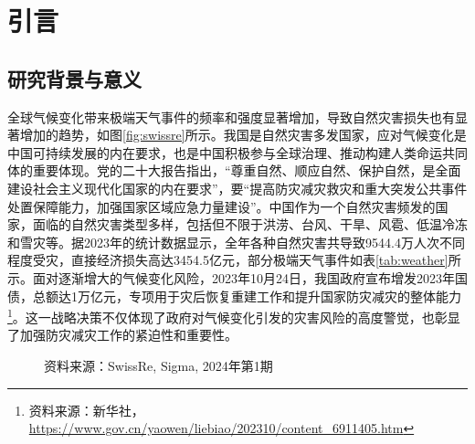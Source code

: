 \chapter{引言}
\section{研究背景与意义}

全球气候变化带来极端天气事件的频率和强度显著增加，导致自然灾害损失也有显著增加的趋势，如图\ref{fig:swissre}所示。我国是自然灾害多发国家，应对气候变化是中国可持续发展的内在要求，也是中国积极参与全球治理、推动构建人类命运共同体的重要体现。党的二十大报告指出，“尊重自然、顺应自然、保护自然，是全面建设社会主义现代化国家的内在要求”，要“提高防灾减灾救灾和重大突发公共事件处置保障能力，加强国家区域应急力量建设”。中国作为一个自然灾害频发的国家，面临的自然灾害类型多样，包括但不限于洪涝、台风、干旱、风雹、低温冷冻和雪灾等。据2023年的统计数据显示，全年各种自然灾害共导致9544.4万人次不同程度受灾，直接经济损失高达3454.5亿元，部分极端天气事件如表\ref{tab:weather}所示。面对逐渐增大的气候变化风险，2023年10月24日，我国政府宣布增发2023年国债，总额达1万亿元，专项用于灾后恢复重建工作和提升国家防灾减灾的整体能力\footnote{资料来源：新华社，\url{https://www.gov.cn/yaowen/liebiao/202310/content_6911405.htm}}。这一战略决策不仅体现了政府对气候变化引发的灾害风险的高度警觉，也彰显了加强防灾减灾工作的紧迫性和重要性。

\begin{figure}[htbp]
    \par\qquad {} 资料来源：SwissRe, Sigma, 2024年第1期
\end{figure}


